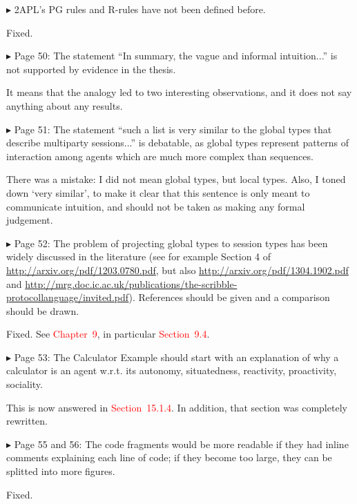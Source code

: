 \documentclass{article}
\newcommand*\R[1]{\textcolor{red}{#1}} %
\newenvironment{them}%
  {\bigskip\noindent\begingroup\color{blue}$\blacktriangleright$\enspace}%
  {\endgroup\par}
\begin{document}
\begin{them}
2APL's PG rules and R-rules have not been defined before.
\end{them}
Fixed.

\begin{them}
Page 50:
The statement ``In summary, the vague and informal intuition...'' is not
supported by evidence in the thesis.
\end{them}
It means that the analogy led to two interesting observations, and it does not
say anything about any results.

\begin{them}
Page 51:
The statement ``such a list is very similar to the global types that describe
multiparty sessions...'' is debatable, as global types represent patterns of
interaction among agents which are much more complex than sequences.
\end{them}

There was a mistake: I did not mean global types, but local types.
Also, I toned down `very similar',
  to make it clear that this sentence is only meant to communicate intuition,
and should not be taken as making any formal judgement.


\begin{them}
Page 52:
The problem of projecting global types to session types has been widely
discussed in the literature (see for example Section 4 of
\url{http://arxiv.org/pdf/1203.0780.pdf}, but also
\url{http://arxiv.org/pdf/1304.1902.pdf} and
\url{http://mrg.doc.ic.ac.uk/publications/the-scribble-protocollanguage/invited.pdf}).
References should be given and a comparison should be drawn.
\end{them}

Fixed.
See \R{Chapter~9},
  in particular \R{Section~9.4}.

\begin{them}
Page 53:
The Calculator Example should start with an explanation of why a calculator is
an agent w.r.t. its autonomy, situatedness, reactivity, proactivity, sociality.
\end{them}
This is now answered in \R{Section~15.1.4}.
In addition, that section was completely rewritten.


\begin{them}
Page 55 and 56:
The code fragments would be more readable if they had inline comments
explaining each line of code; if they become too large, they can be splitted
into more figures.
\end{them}
Fixed.
\end{document}
